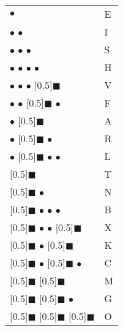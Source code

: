 \documentclass[11pt]{amsart}
\newcommand{\MorseDot}{$\bullet$ }
\newcommand{\MorseDash}{\scalebox{1.5}[0.5]{$\blacksquare$} }
\begin{document}
\begin{tabular}{|ll|}
\hline
\MorseDot & E \\
\MorseDot\MorseDot & I \\
\MorseDot\MorseDot\MorseDot & S \\
\MorseDot\MorseDot\MorseDot\MorseDot & H \\
\MorseDot\MorseDot\MorseDot\MorseDash & V \\
\MorseDot\MorseDot\MorseDash\MorseDot & F \\
\MorseDot\MorseDash & A \\
\MorseDot\MorseDash\MorseDot & R \\
\MorseDot\MorseDash\MorseDot\MorseDot & L \\
\MorseDash & T \\
\MorseDash\MorseDot & N \\
\MorseDash\MorseDot\MorseDot\MorseDot & B \\
\MorseDash\MorseDot\MorseDot\MorseDash & X \\
\MorseDash\MorseDot\MorseDash & K \\
\MorseDash\MorseDot\MorseDash\MorseDot & C \\
\MorseDash\MorseDash & M \\
\MorseDash\MorseDash\MorseDot & G \\
\MorseDash\MorseDash\MorseDash & O \\
\hline
\end{tabular}
\end{document}
